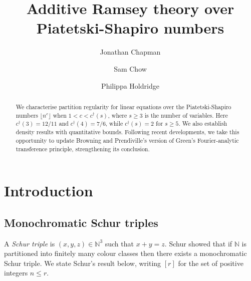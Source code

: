 \documentclass[12pt, reqno]{amsart}
\theoremstyle{definition}
\theoremstyle{remark}
\numberwithin{equation}{section}
\theoremstyle{definition}
\def\le{\leqslant} \def\ge{\geqslant} \def\pleq{\preccurlyeq} \def\ple{\prec}
\def \bN {\mathbb N}
\begin{document}
\title[Schur--Piatetski-Shapiro]{Additive Ramsey theory over Piatetski-Shapiro numbers}
\author{Jonathan Chapman \and Sam Chow \and Philippa Holdridge}

\address{Mathematics Institute, Zeeman Building, University of Warwick, Coventry CV4 7AL, United Kingdom}


\address{Mathematics Institute, Zeeman Building, University of Warwick, Coventry CV4 7AL, United Kingdom}

\address{Mathematics Institute, Zeeman Building, University of Warwick, Coventry CV4 7AL, United Kingdom}

\begin{abstract} We characterise partition regularity for linear equations over the Piatetski-Shapiro numbers $\lfloor n^c \rfloor$ when $1 < c < c^\dag(s)$, where $s \ge 3$ is the number of variables. Here $c^\dag(3) = 12/11$ and $c^\dag(4) = 7/6$, while $c^\dag(s) = 2$ for $s \ge 5$. We also establish density results with quantitative bounds. Following recent developments, we take this opportunity to update Browning and Prendiville's version of Green's Fourier-analytic transference principle, strengthening its conclusion.
\end{abstract}

\maketitle

\section{Introduction}

\subsection{Monochromatic Schur triples}

A \emph{Schur triple} is $(x,y,z) \in \bN^3$ such that $x + y = z$. Schur \cite{Sch1916} showed that if $\bN$ is partitioned into finitely many colour classes then there exists a monochromatic Schur triple. We state Schur's result below, writing $[r]$ for the set of positive integers $n \le r$.
\end{document}
